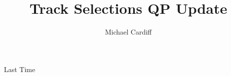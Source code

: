 \documentclass{beamer}
\title{Track Selections QP Update}
\author{Michael Cardiff}
\subtitle{}
\begin{document}
\begin{frame}
  \titlepage
\end{frame}

\begin{frame}{Last Time}
  
\end{frame}
\end{document}
